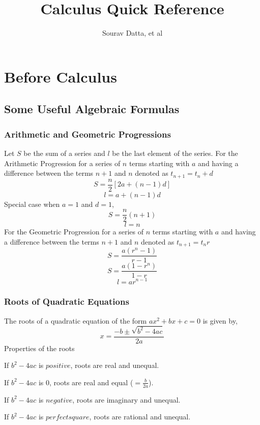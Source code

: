 \documentclass[a4paper]{book}
\title{\LARGE{Calculus Quick Reference}}
\author{Sourav Datta, et al}
\date{}
\begin{document}
\maketitle

\part{Before Calculus}

\chapter{Some Useful Algebraic Formulas}

\section{Arithmetic and Geometric Progressions}
Let $S$ be the sum of a series and $l$ be the last element of the series. 
For the Arithmetic Progression for a series of $n$ terms starting with $a$ and having a difference between the terms $n+1$ and $n$ denoted as $t_{n+1} = t_{n} + d$
\begin{equation}
S = \frac{n}{2}[2a + (n - 1)d]
\end{equation}
\begin{equation}
l = a + (n - 1)d
\end{equation}
Special case when $a = 1$ and $d = 1$,
\begin{equation}
S = \frac{n}{2}(n + 1)
\end{equation}
\begin{equation}
l = n
\end{equation}
For the Geometric Progression for a series of $n$ terms starting with $a$ and having a difference between the terms $n+1$ and $n$ denoted as $t_{n+1} = t_{n}r$
\begin{equation}
S = \frac{a(r^{n} - 1)}{r - 1}
\end{equation}
\begin{equation}
S = \frac{a(1 - r^{n})}{1 - r}
\end{equation}
\begin{equation}
l = ar^{n - 1}
\end{equation}

\section{Roots of Quadratic Equations}
The roots of a quadratic equation of the form $ax^{2} + bx + c = 0$ is given by,
\begin{equation}
x = \frac{-b \pm \sqrt{b^{2} - 4ac}}{2a}
\end{equation}
Properties of the roots
\begin{description}
\item If $b^{2} - 4ac$ is $positive$, roots are real and unequal.
\item If $b^{2} - 4ac$ is $0$, roots are real and equal ($= \frac{b}{2a}$).
\item If $b^{2} - 4ac$ is $negative$, roots are imaginary and unequal.
\item If $b^{2} - 4ac$ is $perfect square$, roots are rational and unequal.
\end{description}
\end{document}
